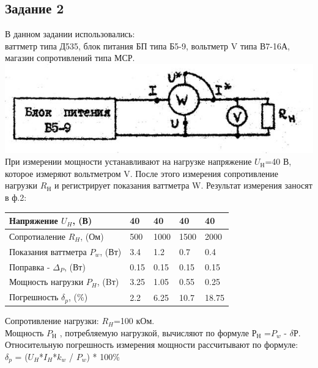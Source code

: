 
\newpage
\subsection*{Задание 2}
	В данном задании использовались:\\
ваттметр типа Д535, блок питания БП типа Б5-9, вольтметр V типа В7-16А, магазин сопротивлений типа МСР.\\
\includegraphics[width=\textwidth]{Part2.png}\\
	При измерении мощности устанавливают на нагрузке напряжение $U_{Н}$=40 В, которое измеряют вольтметром V. После этого измерения сопротивление нагрузки $R_{Н}$ и регистрирует показания ваттметра W. Результат измерения заносят в ф.2:\\

	\begin{table} [h!]
 	 	\begin{tabular}{|p{6cm}|p{2cm}|p{2cm}|p{2cm}|p{2cm}|}
		 	\hline
		 	Напряжение $U_{H}$, (В) & 40 & 40 & 40 & 40 \\
		 	\hline
		 	Сопротиаление $R_{H}$, (Ом) & 500 & 1000 & 1500 & 2000 \\
		 	\hline
		 	Показания ваттметра $P_{w}$, (Вт) & 3.4 & 1.2 & 0.7 & 0.4 \\
		 	\hline
		 	Поправка - $\Delta _{P}$, (Вт) & 0.15 & 0.15 & 0.15 & 0.15 \\
		 	\hline
		 	Мощность нагрузки $P_{H}$, (Bт) & 3.25 & 1.05 & 0.55 & 0.25 \\
		 	\hline
		 	Погрешность $\delta _{p}$, (\%) & 2.2 & 6.25 & 10.7 & 18.75 \\
		 	\hline
 		\end{tabular}
	\end{table}

 	\vspace{1cm}

 	Сопротивление нагрузки: $R_{H}$=100 кОм.\\
 	Мощность $P_{Н}$ , потребляемую нагрузкой, вычисляют по формуле $Р_{Н}$ =$P_{w}$ - $\delta$Р.\\
 	Относительную погрешность измерения мощности рассчитывают по формуле:\\
 	$\delta _{p}$ = ($U_{H}$*$I_{H}$*$k_{w}$ / $P_{w}$) * 100\%

